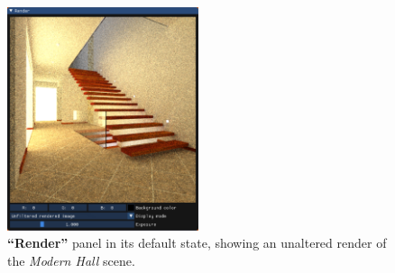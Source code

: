 \begin{figure}
	\centering
	\includegraphics[width=0.5\textwidth]{chapters/chapter_thetool/imagewidget_full}
	\caption{\textbf{“Render”} panel in its default state, showing an unaltered render of the \textit{Modern Hall} \cite{bitterliscenes} scene.}
	\label{imagewidget_full}
\end{figure}

